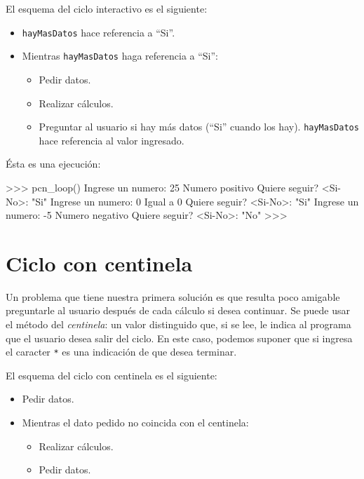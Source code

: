 El esquema del ciclo interactivo es el siguiente:
\begin{itemize}
\item \lstinline!hayMasDatos! hace referencia a ``Si''.
\item Mientras \lstinline!hayMasDatos! haga referencia a ``Si'':

\begin{itemize}
\item Pedir datos.
\item Realizar cálculos.
\item Preguntar al usuario si hay más datos (``Si'' cuando los hay).
\lstinline!hayMasDatos! hace referencia al valor ingresado.
\end{itemize}

\end{itemize}

Ésta es una ejecución:

\begin{codigo-python-sn}
>>> pcn_loop()
Ingrese un numero: 25
Numero positivo
Quiere seguir? <Si-No>: "Si"
Ingrese un numero: 0
Igual a 0
Quiere seguir? <Si-No>: "Si"
Ingrese un numero: -5
Numero negativo
Quiere seguir? <Si-No>: "No"
>>>
\end{codigo-python-sn}

\section{Ciclo con centinela}
\label{centinela}

Un problema que tiene nuestra primera solución es que resulta poco amigable
preguntarle al usuario después de cada cálculo si desea continuar. Se puede
usar el método del {\it centinela}: un valor distinguido que, si se lee, le
indica al programa que el usuario desea salir del ciclo. En este caso,
podemos suponer que si ingresa el caracter \lstinline!*! es una indicación
de que desea terminar.

El esquema del ciclo con centinela es el siguiente:

\begin{itemize}
\item Pedir datos.
\item Mientras el dato pedido no coincida con el centinela:
\begin{itemize}
\item Realizar cálculos.
\item Pedir datos.
\end{itemize}
\end{itemize}

